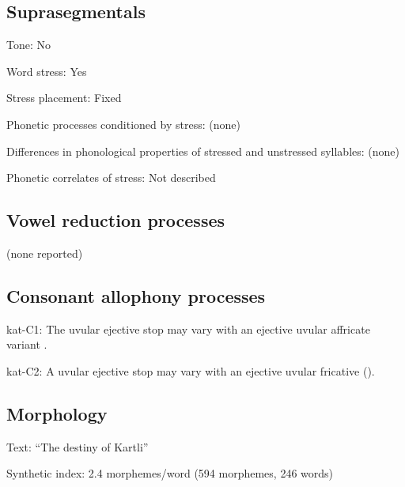 {\subsection*{Suprasegmentals}
\begin{appendixdesc}
\item[Tone:] No

\item[Word stress:] Yes

\item[Stress placement:] Fixed

\item[Phonetic processes conditioned by stress:] (none)

\item[Differences in phonological properties of stressed and unstressed syllables:] (none)

\item[Phonetic correlates of stress:] Not described
\end{appendixdesc}
\subsection*{Vowel reduction processes}

(none reported)
\subsection*{Consonant allophony processes}
\begin{appendixdesc}

\item[kat-C1:] The uvular ejective stop may vary with an ejective uvular affricate variant \citep{Aronson1991}.

\item[kat-C2:] A uvular ejective stop may vary with an ejective uvular fricative (\citealt{ShostedChikovani2006}).
\end{appendixdesc}
\subsection*{Morphology}

\begin{appendixdesc}

\item[Text:] “The destiny of Kartli” \citep[655--663]{Hewitt1995}

\item[Synthetic index:] 2.4 morphemes/word (594 morphemes, 246 words)
\end{appendixdesc}
}
